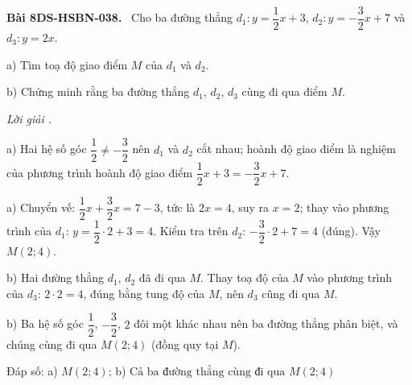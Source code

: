 \documentclass[12pt,a4paper]{article}
\newenvironment{problem}[1][]{\par\medskip\noindent\textbf{Bài #1.}\ }{\par}
\newenvironment{solution}[1][]{\par\noindent\textit{Lời giải #1.}\par}{\par}
\begin{document}
\begin{problem}[8DS-HSBN-038]
Cho ba đường thẳng $d_1\colon y = \dfrac{1}{2}x + 3$, $d_2\colon y = -\dfrac{3}{2}x + 7$ và $d_3\colon y = 2x$.

a) Tìm toạ độ giao điểm $M$ của $d_1$ và $d_2$.

b) Chứng minh rằng ba đường thẳng $d_1$, $d_2$, $d_3$ cùng đi qua điểm $M$.

\begin{solution}
a) Hai hệ số góc $\dfrac{1}{2} \neq -\dfrac{3}{2}$ nên $d_1$ và $d_2$ cắt nhau; hoành độ giao điểm là nghiệm của phương trình hoành độ giao điểm $\dfrac{1}{2}x + 3 = -\dfrac{3}{2}x + 7$.

a) Chuyển vế: $\dfrac{1}{2}x + \dfrac{3}{2}x = 7 - 3$, tức là $2x = 4$, suy ra $x = 2$; thay vào phương trình của $d_1$: $y = \dfrac{1}{2} \cdot 2 + 3 = 4$. Kiểm tra trên $d_2$: $-\dfrac{3}{2} \cdot 2 + 7 = 4$ (đúng). Vậy $M(2; 4)$.

b) Hai đường thẳng $d_1$, $d_2$ đã đi qua $M$. Thay toạ độ của $M$ vào phương trình của $d_3$: $2 \cdot 2 = 4$, đúng bằng tung độ của $M$, nên $d_3$ cũng đi qua $M$.

b) Ba hệ số góc $\dfrac{1}{2}$, $-\dfrac{3}{2}$, $2$ đôi một khác nhau nên ba đường thẳng phân biệt, và chúng cùng đi qua $M(2; 4)$ (đồng quy tại $M$).

Đáp số: a) $\boxed{M(2; 4)}$; b) $\boxed{\text{Cả ba đường thẳng cùng đi qua } M(2; 4)}$
\end{solution}
\end{problem}
\end{document}
